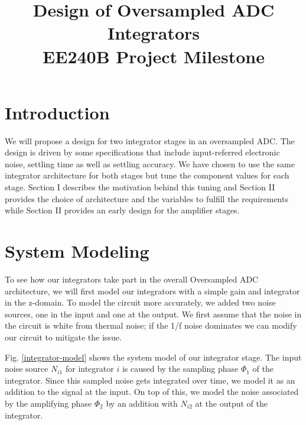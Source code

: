 \documentclass[conference]{IEEEtran}
\begin{document}
\title{Design of Oversampled ADC Integrators \\ \Large EE240B Project Milestone}
\author{
\and
{}
}
\maketitle

\section{Introduction}

We will propose a design for two integrator stages in an oversampled ADC. The design is driven by some specifications that include input-referred electronic noise, settling time as well as settling accuracy. We have chosen to use the same integrator architecture for both stages but tune the component values for each stage. Section I describes the motivation behind this tuning and Section II provides the choice of architecture and the variables to fulfill the requirements while Section II provides an early design for the amplifier stages.



\section{System Modeling}

To see how our integrators take part in the overall Oversampled ADC architecture, we will first model our integrators with a simple gain and integrator in the z-domain. To model the circuit more accurately, we added two noise sources, one in the input and one at the output. We first assume that the noise in the circuit is white from thermal noise; if the 1/f noise dominates we can modify our circuit to mitigate the issue.

Fig. \ref{integrator-model} shows the system model of our integrator stage. The input noise source $N_{i1}$ for integrator $i$ is caused by the sampling phase $\Phi_1$ of the integrator. Since this sampled noise gets integrated over time, we model it as an addition to the signal at the input. On top of this, we model the noise associated by the amplifying phase $\Phi_2$ by an addition with $N_{i2}$ at the output of the integrator.
\end{document}
